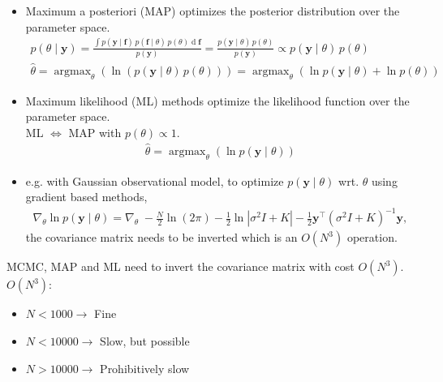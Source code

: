 \documentclass[8pt]{beamer} %
\DeclareMathOperator*{\argmax}{argmax}
\begin{document}
\begin{frame}

\begin{itemize}\setlength\itemsep{2mm}
\item {\color{navyblue} Maximum a posteriori} (MAP) optimizes the posterior distribution over the parameter space.
 \begin{gather*}
	p(\theta \mid \bm{y}) = \frac{\int p(\bm{y}\mid \bm{f})\, p(\bm{f}\mid \theta)\, p(\theta) \operatorname{d}\bm{f}}{p(\bm{y})}  = \frac{p(\bm{y}\mid \theta)\, p(\theta)}{p(\bm{y})} \propto p(\bm{y}\mid \theta)\, p(\theta)\\[3mm]
%
 \hat{\theta} = \argmax_\theta \left( \ln \left( p(\bm{y}\mid \theta)\, p(\theta)\right) \right) = \argmax_\theta \left( \ln p(\bm{y}\mid \theta) + \ln p(\theta) \right)
 \end{gather*}

\item {\color{navyblue} Maximum likelihood} (ML) methods optimize the likelihood function over the parameter space.\\[1mm]
 ML $\Leftrightarrow$ MAP with $p(\theta)\propto 1$.
 \begin{gather*}
 \hat{\theta} = \argmax_\theta \left( \ln p(\bm{y}\mid \theta) \right)
 \end{gather*}

\item e.g. with Gaussian observational model, to optimize $p(\bm{y}\mid \theta)$ wrt. $\theta$ using gradient based methods,
%
\begin{align*}
\nabla_\theta \ln p(\bm{y}\mid \theta)= \nabla_\theta\; -\frac{N}{2}\ln(2\pi)-\frac{1}	{2}\ln|\sigma^2I+K|-\frac{1}{2}\bm{y}^\intercal(\sigma^2I+K)^{-1}\bm{y},
\end{align*}
%
the {\color{navyblue} covariance matrix needs to be inverted} which is an $O(N^3)$ operation.

\end{itemize}
\end{frame}

\begin{frame}

{\color{navyblue} MCMC}, {\color{navyblue} MAP} and {\color{navyblue} ML} need to invert the covariance matrix with cost $O(N^3)$.\\[0.7cm]

$O(N^3)$:
	\begin{itemize}\setlength\itemsep{2mm}
	\item[] $N < 1000 \to$ Fine
	\item[] $N < 10000 \to$ Slow, but possible
	\item[] $N > 10000 \to$ Prohibitively slow
	\end{itemize}
\end{frame}
\end{document}
